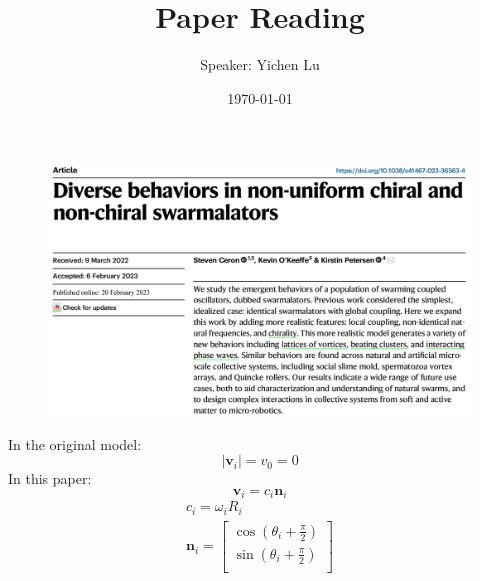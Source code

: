 \documentclass[10pt,aspectratio=43,mathserif,table]{beamer}
\title{Paper Reading}
\author{Speaker: Yichen Lu\quad \newline  \newline \quad }
\institute{\fontsize{8pt}{14pt}}
\date{\today}
\begin{document}

\begin{frame}
    \begin{figure}
        \centering
        \includegraphics[width=\textwidth]{title.jpg}
    \end{figure}
\end{frame}

\begin{frame}
    In the original model:
        $$|\mathbf{v}_i|=v_0=0$$
    In this paper:
        $$
        \mathbf{v}_i=c_i \mathbf{n}_i
        $$
        $$
        \begin{array}{c}
            c_i=\omega _iR_i\\
            \mathbf{n}_i=\left[ \begin{array}{c}
            \cos \left( \theta _i+\frac{\pi}{2} \right)\\
            \sin \left( \theta _i+\frac{\pi}{2} \right)\\
        \end{array} \right]\\
        \end{array}
        $$

\end{frame}
\end{document}
